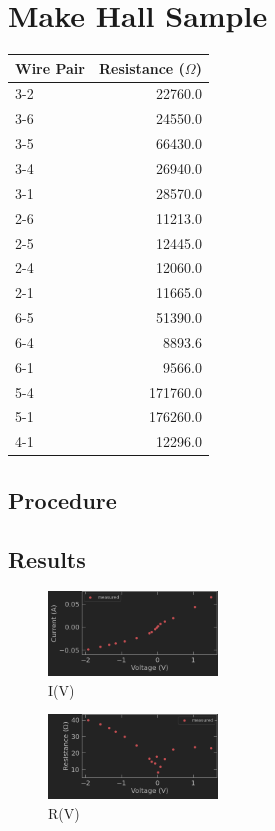 \documentclass[aps,prl,reprint]{revtex4-2}
\begin{document}
\section{Make Hall Sample}

\begin{tabular}{lr}
\toprule
Wire Pair &  Resistance ($\Omega$) \\
\midrule
\hline
3-2       &     22760.0 \\
3-6       &     24550.0 \\
3-5       &     66430.0 \\
3-4       &     26940.0 \\
3-1       &     28570.0 \\
2-6       &     11213.0 \\
2-5       &     12445.0 \\
2-4       &     12060.0 \\
2-1       &     11665.0 \\
6-5       &     51390.0 \\
6-4       &      8893.6 \\
6-1       &      9566.0 \\
5-4       &    171760.0 \\
5-1       &    176260.0 \\
4-1       &     12296.0 \\
\hline
\hline
\bottomrule
\end{tabular}

\subsection{Procedure}


\subsection{Results}

\begin{figure}[h]
\includegraphics[width=0.4\textwidth]{../Images/l2_a_1.png}
\caption{\label{figA}I(V)}
\end{figure}

\begin{figure}[h]
\includegraphics[width=0.4\textwidth]{../Images/l2_a_2.png}
\caption{\label{figA}R(V)}
\end{figure}
\end{document}
